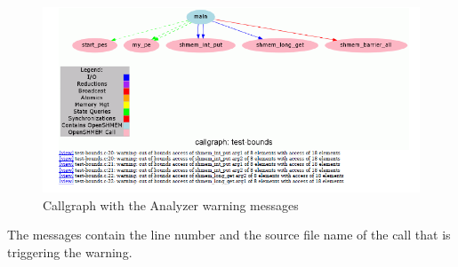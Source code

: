 \vspace{0.1in}

\begin{figure}[!ht]
  \begin{center}
    \includegraphics[width=1.0\textwidth]{./callgraph_test_bounds}
    \caption{Callgraph with the \openshmem Analyzer warning messages}
    \label{fig:warnings}
  \end{center}
\end{figure}

The messages contain the line number and the source file name of the
\openshmem call that is triggering the warning.

